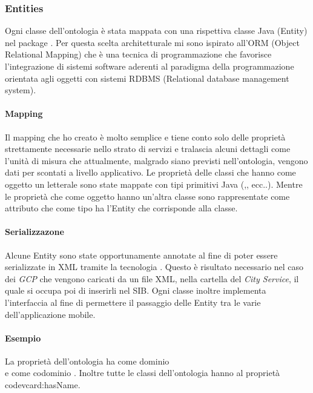 
\subsubsection{Entities}

Ogni classe dell'ontologia è stata mappata con una rispettiva classe Java (Entity) nel package  . Per questa scelta architetturale mi sono ispirato all'ORM (Object Relational Mapping) che è una tecnica di programmazione che favorisce l'integrazione di sistemi software aderenti al paradigma della programmazione orientata agli oggetti con sistemi RDBMS (Relational database management system). %

\paragraph{Mapping} Il mapping che ho creato è molto semplice e tiene conto solo delle proprietà strettamente necessarie nello strato di servizi e tralascia alcuni dettagli come l'unità di misura che attualmente, malgrado siano previsti nell'ontologia, vengono dati per scontati a livello applicativo.
Le proprietà delle classi che hanno come oggetto un letterale sono state mappate con tipi primitivi Java (,, ecc..). Mentre le proprietà che come oggetto hanno un'altra classe sono rappresentate come attributo che come tipo ha l'Entity
che corrisponde alla classe. 

\paragraph{Serializzazone} Alcune Entity sono state opportunamente annotate al fine di poter essere serializzate in XML tramite la tecnologia . Questo è risultato necessario nel caso dei \emph{GCP} che vengono caricati da un file XML, nella cartella del \emph{City Service}, il quale si occupa poi di inserirli nel SIB. Ogni classe inoltre implementa l'interfaccia  al fine di permettere il passaggio delle Entity tra le varie  dell'applicazione mobile.

\paragraph{Esempio}

La proprietà dell'ontologia  ha come dominio \\  e come codominio . Inoltre tutte le classi dell'ontologia hanno al proprietà code{vcard:hasName}.

